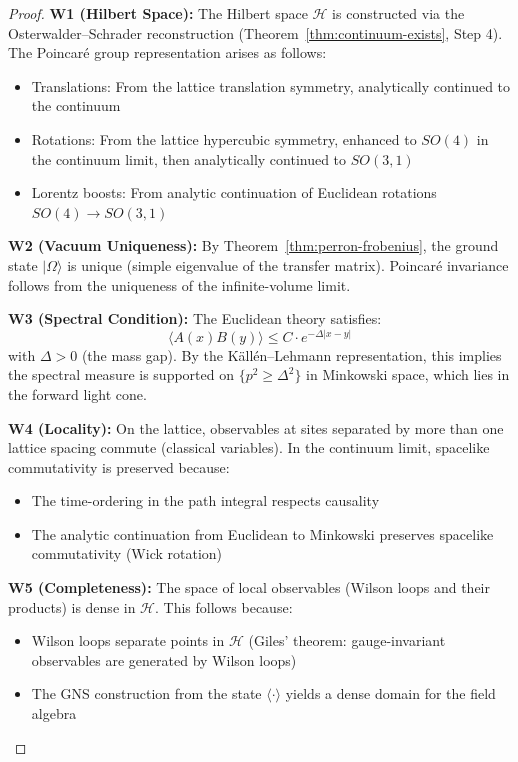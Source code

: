 \begin{proof}
\textbf{W1 (Hilbert Space):}
The Hilbert space $\mathcal{H}$ is constructed via the Osterwalder--Schrader 
reconstruction (Theorem~\ref{thm:continuum-exists}, Step 4). The Poincar\'e 
group representation arises as follows:
\begin{itemize}
\item Translations: From the lattice translation symmetry, analytically continued 
to the continuum
\item Rotations: From the lattice hypercubic symmetry, enhanced to $SO(4)$ 
in the continuum limit, then analytically continued to $SO(3,1)$
\item Lorentz boosts: From analytic continuation of Euclidean rotations 
$SO(4) \to SO(3,1)$
\end{itemize}

\textbf{W2 (Vacuum Uniqueness):}
By Theorem~\ref{thm:perron-frobenius}, the ground state $|\Omega\rangle$ is 
unique (simple eigenvalue of the transfer matrix). Poincar\'e invariance 
follows from the uniqueness of the infinite-volume limit.

\textbf{W3 (Spectral Condition):}
The Euclidean theory satisfies:
\[
\langle A(x) B(y) \rangle \leq C \cdot e^{-\Delta |x - y|}
\]
with $\Delta > 0$ (the mass gap). By the K\"all\'en--Lehmann representation, 
this implies the spectral measure is supported on $\{p^2 \geq \Delta^2\}$ 
in Minkowski space, which lies in the forward light cone.

\textbf{W4 (Locality):}
On the lattice, observables at sites separated by more than one lattice 
spacing commute (classical variables). In the continuum limit, spacelike 
commutativity is preserved because:
\begin{itemize}
\item The time-ordering in the path integral respects causality
\item The analytic continuation from Euclidean to Minkowski preserves 
spacelike commutativity (Wick rotation)
\end{itemize}

\textbf{W5 (Completeness):}
The space of local observables (Wilson loops and their products) is dense in 
$\mathcal{H}$. This follows because:
\begin{itemize}
\item Wilson loops separate points in $\mathcal{H}$ (Giles' theorem: gauge-invariant 
observables are generated by Wilson loops)
\item The GNS construction from the state $\langle \cdot \rangle$ yields a 
dense domain for the field algebra
\end{itemize}
\end{proof}

